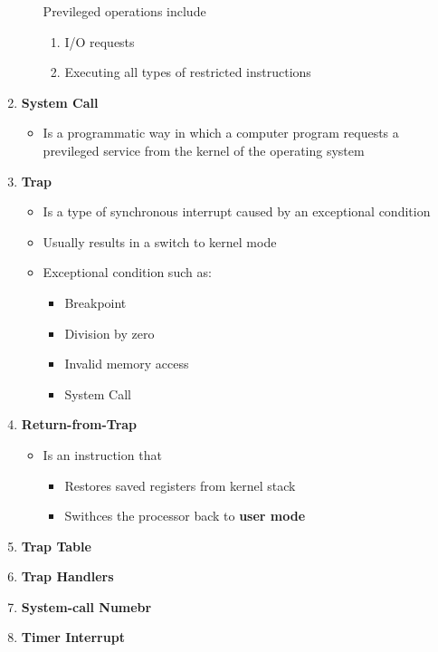 \documentclass[12pt]{article}
\begin{document}
\begin{mdframed}
\begin{enumerate}[1.]
\begin{itemize}
        \bigskip

        Previleged operations include

        \begin{enumerate}[1.]
            \item I/O requests
            \item Executing all types of restricted instructions
        \end{enumerate}
    \end{itemize}
    \item \textbf{System Call}
    \begin{itemize}
        \item Is a programmatic way in which a computer program requests a previleged
        service from the kernel of the operating system
    \end{itemize}
    \item \textbf{Trap}
    \begin{itemize}
        \item Is a type of synchronous interrupt caused by an exceptional condition
        \item Usually results in a switch to kernel mode
        \item Exceptional condition such as:
        \begin{itemize}
            \item Breakpoint
            \item Division by zero
            \item Invalid memory access
            \item System Call
        \end{itemize}
    \end{itemize}
    \item \textbf{Return-from-Trap}
    \begin{itemize}
        \item Is an instruction that
        \begin{itemize}
            \item Restores saved registers from kernel stack
            \item Swithces the processor back to \textbf{user mode}
        \end{itemize}
    \end{itemize}
    \item \textbf{Trap Table}
    \item \textbf{Trap Handlers}
    \item \textbf{System-call Numebr}
    \item \textbf{Timer Interrupt}
\end{enumerate}

\end{mdframed}
\end{document}
